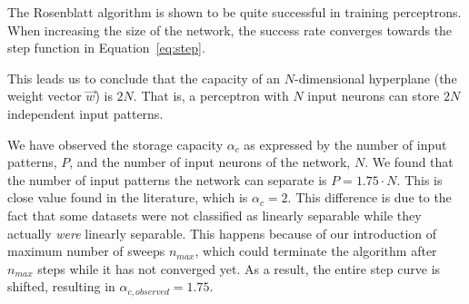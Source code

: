The Rosenblatt algorithm is shown to be quite successful in training perceptrons.
When increasing the size of the network, the success rate converges towards the step function in Equation~\ref{eq:step}.

This leads us to conclude that the capacity of an \(N\)-dimensional hyperplane (the weight vector \(\vec{w}\)) is \(2N\).
That is, a perceptron with \(N\) input neurons can store \(2N\) independent input patterns.

We have observed the storage capacity $\alpha_c$ as expressed by the number of input patterns, $P$, and the number of input neurons of the network, $N$.
We found that the number of input patterns the network can separate is $P = 1.75 \cdot N$.
This is close value found in the literature, which is $\alpha_c = 2$.
This difference is due to the fact that some datasets were not classified as linearly separable while they actually \emph{were} linearly separable.
This happens because of our introduction of maximum number of sweeps $n_{max}$, which could terminate the algorithm after $n_{max}$ steps while it has not converged yet.
As a result, the entire step curve is shifted, resulting in $\alpha_{c, observed} = 1.75$.